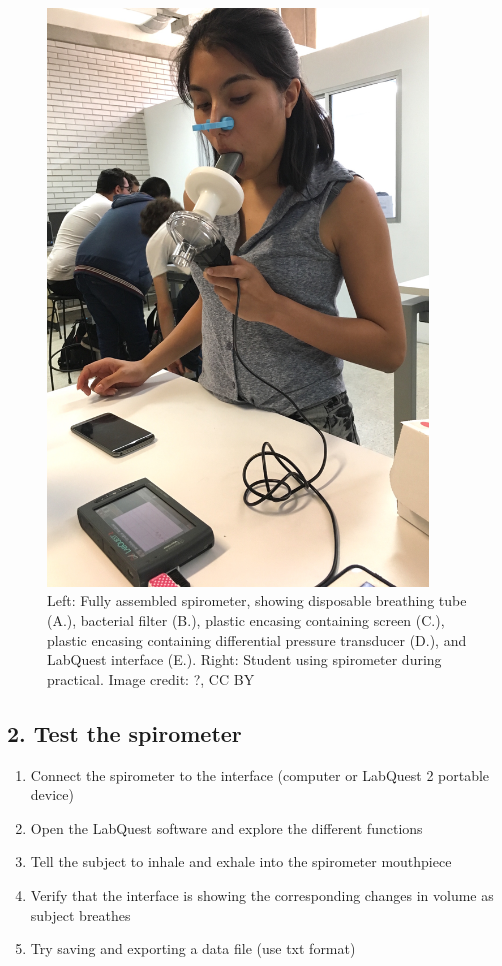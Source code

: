 \documentclass[12pt]{article}
\begin{document}
\begin{figure}[h!]
\begin{center}
\begin{minipage}{.43\textwidth}
\includegraphics[width=0.9\textwidth]{images/spiro_breathing.JPG}
\end{minipage}
\end{center}
\caption{Left: Fully assembled spirometer, showing disposable breathing tube (A.), bacterial filter (B.), plastic encasing containing screen (C.), plastic encasing containing differential pressure transducer (D.), and LabQuest interface (E.). Right: Student using spirometer during practical. Image credit: ?, CC BY}
\label{fig:spirAssembly}
\end{figure}

\subsection*{2. Test the spirometer}

\begin{enumerate}
\item Connect the spirometer to the interface (computer or LabQuest 2 portable device)
\item Open the LabQuest software and explore the different functions
\item Tell the subject to inhale and exhale into the spirometer mouthpiece
\item Verify that the interface is showing the corresponding changes in volume as subject breathes
\item Try saving and exporting a data file (use txt format)
\end{enumerate}
\end{document}

